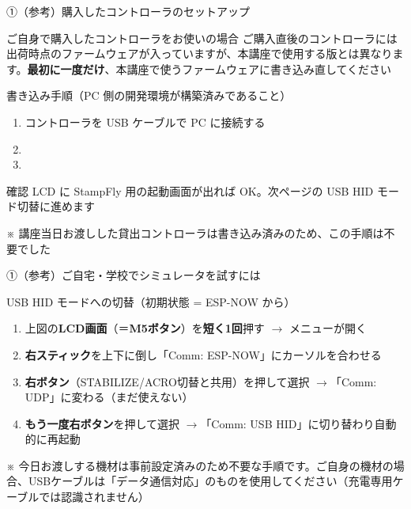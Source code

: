 \begin{frame}{①（参考）購入したコントローラのセットアップ}
  \begin{alertblock}{ご自身で購入したコントローラをお使いの場合}
    \footnotesize ご購入直後のコントローラには出荷時点のファームウェアが入っていますが、本講座で使用する版とは異なります。\textbf{最初に一度だけ}、本講座で使うファームウェアに書き込み直してください
  \end{alertblock}

  \begin{block}{書き込み手順（PC 側の開発環境が構築済みであること）}
    \begin{enumerate}\footnotesize
      \setlength{\itemsep}{0pt}
      \item コントローラを USB ケーブルで PC に接続する
      \item {}
      \item {}
    \end{enumerate}
  \end{block}

  \vspace{0.1em}

  \begin{exampleblock}{確認}
    \footnotesize LCD に StampFly 用の起動画面が出れば OK。次ページの USB HID モード切替に進めます
  \end{exampleblock}

  {\footnotesize ※ 講座当日お渡しした貸出コントローラは書き込み済みのため、この手順は不要でした}
\end{frame}

\begin{frame}{①（参考）ご自宅・学校でシミュレータを試すには}
  \begin{center}
    \resizebox{!}{0.28\textheight}{}
  \end{center}

  \begin{block}{USB HID モードへの切替（初期状態 = ESP-NOW から）}
    \begin{enumerate}\footnotesize
      \setlength{\itemsep}{0pt}
      \item 上図の\textbf{LCD画面}（＝\textbf{M5ボタン}）を\textbf{短く1回}押す $\to$ メニューが開く
      \item \textbf{右スティック}を上下に倒し「Comm: ESP-NOW」にカーソルを合わせる
      \item \textbf{右ボタン}（STABILIZE/ACRO切替と共用）を押して選択 $\to$「Comm: UDP」に変わる（まだ使えない）
      \item \textbf{もう一度右ボタン}を押して選択 $\to$「Comm: USB HID」に切り替わり自動的に再起動
    \end{enumerate}
  \end{block}

  {\scriptsize ※ 今日お渡しする機材は事前設定済みのため不要な手順です。ご自身の機材の場合、USBケーブルは「データ通信対応」のものを使用してください（充電専用ケーブルでは認識されません）}
\end{frame}

